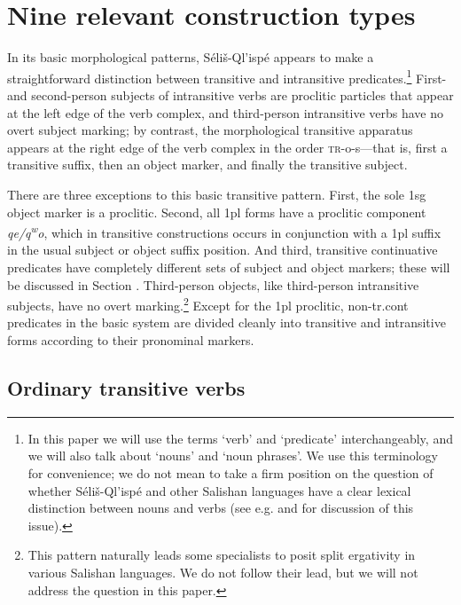 \documentclass[output=paper,colorlinks,citecolor=brown]{langscibook}
\begin{document}
\section{Nine relevant construction types}
\label{thomason_section_2}
In its basic morphological patterns, S\'eli\v{s}-Ql'isp\'e appears to
make a straightforward distinction between transitive and intransitive
predicates.\footnote{In this paper we will use the terms `verb' and
`predicate' interchangeably, and we will also talk about `nouns' and
`noun phrases'.  We use this terminology for convenience; we do not
mean to take a firm position on the question of whether
S\'eli\v{s}-Ql'isp\'e and other Salishan languages have a clear
lexical distinction between nouns and verbs (see e.g. \citealt{Kinkade:1983} and
\citealt{vanEijk&Hess:1986} for discussion of this issue).}  First- and
second-person subjects of intransitive verbs are proclitic particles
that appear at the left edge of the verb complex, and third-person
intransitive verbs have no overt subject marking; by contrast, the
morphological transitive apparatus appears at the right edge of the
verb complex in the order \textsc{tr}-o-s---that is, first a
transitive suffix, then an object marker, and finally the transitive
subject.

There are three exceptions to this basic transitive pattern.  First,
the sole 1sg object marker is a proclitic.  Second, all 1pl forms have
a proclitic component \emph{qe/{q\textsuperscript w}o}, which in
transitive constructions occurs in conjunction with a 1pl suffix in the
usual subject or object suffix position.  And third, transitive
continuative predicates have completely different sets of subject and
object markers; these will be discussed in Section .  Third-person
objects, like third-person intransitive subjects, have no overt
marking.\footnote{This pattern naturally leads some specialists to
posit split ergativity in various Salishan languages.  We do not
follow their lead, but we will not address the question in this
paper.}  Except for the 1pl proclitic, non-tr.cont predicates in
the basic system are divided cleanly into transitive and intransitive
forms according to their pronominal markers.

\subsection{Ordinary transitive verbs}  %
\label{thomason_section_2.1}
\end{document}
